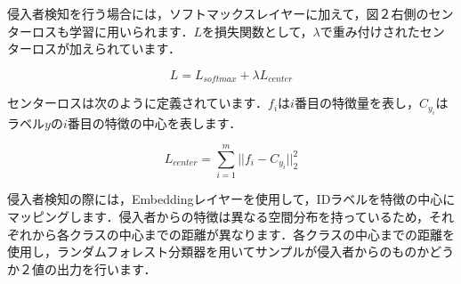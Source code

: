 \documentclass[dvipdfmx]{jsarticle}
\begin{document}
\begin{enumerate}
侵入者検知を行う場合には，ソフトマックスレイヤーに加えて，図２右側のセンターロスも学習に用いられます．$L$を損失関数として，$\lambda$で重み付けされたセンターロスが加えられています．

\begin{equation}
L = L_{softmax} + \lambda L_{center}
\end{equation}

センターロスは次のように定義されています．$f_i$は$i$番目の特徴量を表し，$C_{y_i}$はラベル$y$の$i$番目の特徴の中心を表します．

\begin{equation}\label{}
L_{center} = \sum_{i=1}^{m} ||f_i - C_{y_i}||_2^2
\end{equation}

侵入者検知の際には，Embeddingレイヤーを使用して，IDラベルを特徴の中心にマッピングします．侵入者からの特徴は異なる空間分布を持っているため，それぞれから各クラスの中心までの距離が異なります．各クラスの中心までの距離を使用し，ランダムフォレスト分類器を用いてサンプルが侵入者からのものかどうか２値の出力を行います．

\end{enumerate}
\end{document}
